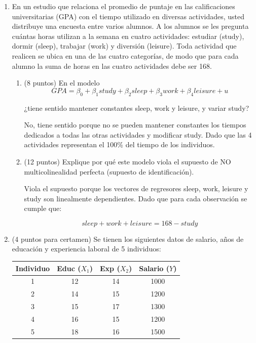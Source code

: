 \documentclass[10pt,a4paper]{article}
\begin{document}
\begin{enumerate}
\begin{enumerate}
{    \[
\text{Var}(\hat{\beta}|X) = \hat{\sigma}^2(X^{\top}X)^{-1}
\]

Solo necesitamos la varianza de los estimadores así que  os quedamos con los elementos de la diagonal de la matriz de var-covar.

$$\text{Var}(\hat{\beta_0}|X)=10,1643\quad 
\text{Var}(\hat{\beta_1}|X)=0,5979
\quad \text{Var}(\hat{\beta_2}|X)=0,0478$$}
\end{enumerate}

\item En un estudio que relaciona el promedio de puntaje en las calificaciones universitarias (GPA) con el
tiempo utilizado en diversas actividades, usted distribuye una encuesta entre varios alumnos.
A los alumnos se les pregunta cuántas horas utilizan a la semana en cuatro actividades: estudiar (study),
dormir (sleep), trabajar (work) y diversión (leisure). Toda actividad que realicen se ubica en una de las cuatro categorías,
de modo que para cada alumno la suma de horas en las cuatro actividades debe ser 168.
\begin{enumerate}
    \item(8 puntos) En el modelo
$$GPA=\beta_0 +\beta_1 study+\beta_2 sleep+\beta_3 work +\beta_4leisure+ u$$

¿tiene sentido mantener constantes sleep, work y leisure, y variar study?

{\color{blue} No, tiene sentido porque no se pueden mantener constantes los tiempos dedicados a todas las otras actividades y modificar study. Dado que las 4 actividades representan el 100\% del tiempo de los individuos.}
\item (12 puntos) Explique por qué este modelo viola el supuesto de NO multicolinealidad perfecta (supuesto de identificación).

{\color{blue}Viola el supuesto porque los vectores de regresores sleep, work, leisure y  study son linealmente dependientes. Dado que para cada observación se cumple que:

$$sleep + work + leisure=168- study$$}

\end{enumerate}

\item (4 puntos para certamen) Se tienen los siguientes datos de salario, años de educación y experiencia laboral de 5 individuos:
\begin{center}
\begin{tabular}{|c|c|c|c|}
\hline
\textbf{Individuo} & \textbf{Educ} ($X_1$) & \textbf{Exp} ($X_2$)  & \textbf{Salario ($Y$)}\\
\hline
1 & 12 & 14 & 1000 \\
2 & 14 & 15 & 1200 \\
3 & 15 & 17 & 1300 \\
4 & 16 & 15 & 1200 \\
5 & 18 & 16 & 1500 \\
\hline
\end{tabular}
\end{center}


\end{enumerate}
\end{document}
